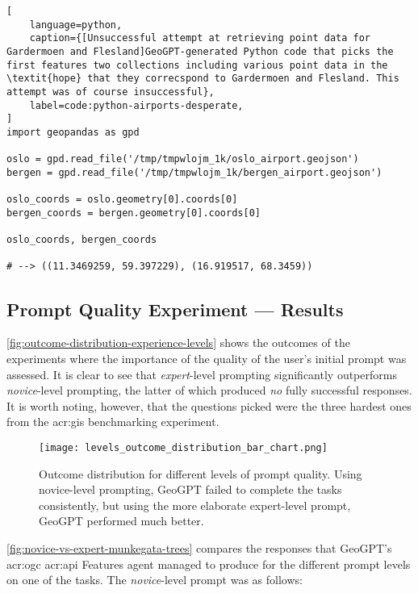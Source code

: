 \FloatBarrier

\begin{lstlisting}[
    language=python,
    caption={[Unsuccessful attempt at retrieving point data for Gardermoen and Flesland]GeoGPT-generated Python code that picks the first features two collections including various point data in the \textit{hope} that they correcspond to Gardermoen and Flesland. This attempt was of course insuccessful},
    label=code:python-airports-desperate,
]
import geopandas as gpd

oslo = gpd.read_file('/tmp/tmpwlojm_1k/oslo_airport.geojson')
bergen = gpd.read_file('/tmp/tmpwlojm_1k/bergen_airport.geojson')

oslo_coords = oslo.geometry[0].coords[0]
bergen_coords = bergen.geometry[0].coords[0]

oslo_coords, bergen_coords   

# --> ((11.3469259, 59.397229), (16.919517, 68.3459))
\end{lstlisting}

\subsection{Prompt Quality Experiment --- Results}
\label{subsec:prompt-quality-test-results}

\autoref{fig:outcome-distribution-experience-levels} shows the outcomes of the experiments where the importance of the quality of the user's initial prompt was assessed. It is clear to see that \textit{expert}-level prompting significantly outperforms \textit{novice}-level prompting, the latter of which produced \textit{no} fully successful responses. It is worth noting, however, that the questions picked were the three hardest ones from the \acrshort{acr:gis} benchmarking experiment.

\begin{figure}[htbp]
    \centering
    \texttt{[image: levels\_outcome\_distribution\_bar\_chart.png]}
    \caption[Outcome distribution for different levels of prompt quality]{Outcome distribution for different levels of prompt quality. Using novice-level prompting, GeoGPT failed to complete the tasks consistently, but using the more elaborate expert-level prompt, GeoGPT performed much better.}
    \label{fig:outcome-distribution-experience-levels}
\end{figure}

\autoref{fig:novice-vs-expert-munkegata-trees} compares the responses that GeoGPT's \acrshort{acr:ogc} \acrshort{acr:api} Features agent managed to produce for the different prompt levels on one of the tasks. The \textit{novice}-level prompt was as follows:

